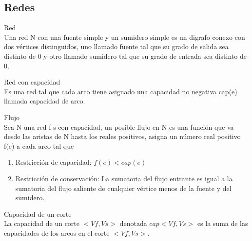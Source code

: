 \documentclass{article}
\begin{document}
\subsection{Redes}
\begin{defn}
 Red \\ Una red N con una fuente simple y un sumidero simple es un digrafo conexo con dos vértices distinguidos, uno llamado fuente tal que su grado de salida sea distinto de 0 y otro llamado sumidero tal que su grado de entrada sea distinto de 0. 
\end{defn}
\begin{defn}
Red con capacidad \\ Es una red tal que cada arco tiene asignado una capacidad no negativa cap(e) llamada capacidad de arco.
\end{defn}
\begin{defn}
Flujo \\ Sea N una red f-s con capacidad, un posible flujo en N es una función que va desde las aristas de N hasta los reales positivos, asigna un número real positivo f(e) a cada arco tal que
\begin{enumerate}
    \item Restricción de capacidad: $f(e)<cap(e)$
    \item Restricción de conservación: La sumatoria del flujo entrante es igual a la sumatoria del flujo saliente de cualquier vértice menos de la fuente y del sumidero.
\end{enumerate}
\end{defn}
\begin{defn}
Capacidad de un corte \\ La capacidad de un corte $<Vf,Vs>$ denotada $cap<Vf,Vs>$ es la suma de las capacidades de los arcos en el corte $<Vf,Vs>$.
\end{defn}
\pagebreak
\end{document}
